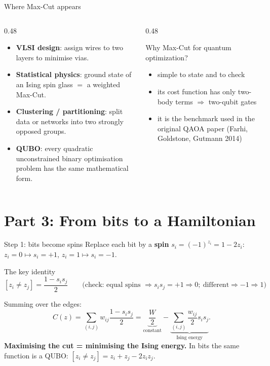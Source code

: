 \documentclass[aspectratio=169,11pt]{beamer}
\newcommand{\hl}[1]{{\color{qorange}\textbf{#1}}}
\newcommand{\key}[1]{{\color{qdark}\textbf{#1}}}
\begin{document}
\begin{frame}{Where Max-Cut appears}
  \begin{columns}[T]
    \begin{column}{0.48\textwidth}
      \begin{itemize}
        \item \key{VLSI design}: assign wires to two layers to minimise vias.
        \item \key{Statistical physics}: ground state of an Ising spin glass $=$ a weighted Max-Cut.
        \item \key{Clustering / partitioning}: split data or networks into two strongly opposed groups.
        \item \key{QUBO}: every quadratic unconstrained binary optimisation problem has the same mathematical form.
      \end{itemize}
    \end{column}
    \begin{column}{0.48\textwidth}
      \begin{block}{Why Max-Cut for quantum optimization?}
        \begin{itemize}
          \item simple to state and to check
          \item its cost function has only two-body terms $\Rightarrow$ two-qubit gates
          \item it is the benchmark used in the original QAOA paper (Farhi, Goldstone, Gutmann 2014)
        \end{itemize}
      \end{block}
    \end{column}
  \end{columns}
\end{frame}

\section{Part 3: From bits to a Hamiltonian}
\begin{frame}{Step 1: bits become spins}
  Replace each bit by a \key{spin} $s_i = (-1)^{z_i} = 1 - 2z_i$: \quad $z_i = 0 \mapsto s_i = +1$, \quad $z_i = 1 \mapsto s_i = -1$.
  \begin{block}{The key identity}
    \[ [z_i \neq z_j] = \frac{1 - s_is_j}{2}
       \qquad\text{(check: equal spins } \Rightarrow s_is_j = +1 \Rightarrow 0;\ \text{different} \Rightarrow -1 \Rightarrow 1) \]
  \end{block}
  Summing over the edges:
  \[ C(z) = \sum_{(i,j)} w_{ij}\frac{1 - s_is_j}{2} = \underbrace{\frac W2}_{\text{constant}} - \underbrace{\sum_{(i,j)}\frac{w_{ij}}{2}s_is_j}_{\text{Ising energy}} . \]
  \hl{Maximising the cut = minimising the Ising energy.} In bits the same function is a QUBO:
  $[z_i \neq z_j] = z_i + z_j - 2z_iz_j$.
\end{frame}
\end{document}
